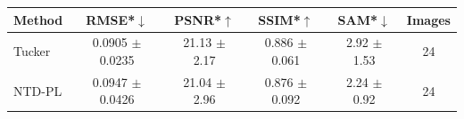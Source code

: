 \begin{tabular}{@{}l c c c c c@{}}
\toprule
Method & RMSE*$\downarrow$ & PSNR*$\uparrow$ & SSIM*$\uparrow$ & SAM*$\downarrow$ & Images\\
\midrule
Tucker & 0.0905 $\pm$ 0.0235 & 21.13 $\pm$ 2.17 & 0.886 $\pm$ 0.061 & 2.92 $\pm$ 1.53 & 24\\
NTD-PL & 0.0947 $\pm$ 0.0426 & 21.04 $\pm$ 2.96 & 0.876 $\pm$ 0.092 & 2.24 $\pm$ 0.92 & 24\\
\bottomrule
\end{tabular}
